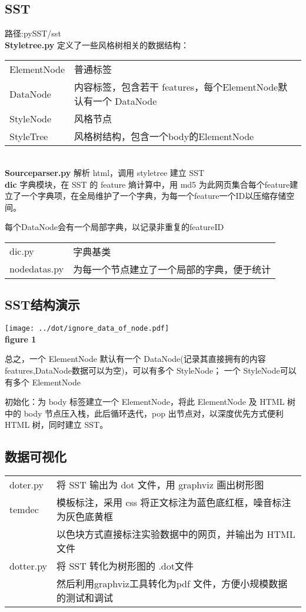 \documentclass[a4paper]{ctexart}
\begin{document}
\subsection[t]{SST}
路径:pySST/sst \\ 
\textbf{Styletree.py}  定义了一些风格树相关的数据结构： \\
\begin{tabular}{ll}
    ElementNode& 普通标签 \\
    DataNode& 内容标签，包含若干 features，每个ElementNode默认有一个 DataNode\\
    StyleNode&  风格节点 \\
    StyleTree& 风格树结构，包含一个body的ElementNode
\end{tabular}\\
\textbf{Sourceparser.py} 解析 html，调用 styletree 建立 SST \\
\textbf{dic} 字典模块，在 SST 的 feature 熵计算中，用 md5 为此网页集合每个feature建立了一个字典项，在全局维护了一个字典，为每一个feature一个ID以压缩存储空间。
\par 每个DataNode会有一个局部字典，以记录非重复的feature\quad ID\\
\begin{tabular}{ll}
    dic.py &字典基类\\
    nodedatas.py &为每一个节点建立了一个局部的字典，便于统计 \\
\end{tabular}
\subsection{SST结构演示}
    \begin{center} 
    \texttt{[image: ../dot/ignore\_data\_of\_node.pdf]}\\
    \textbf{figure 1}
    \end{center}
\par 总之，一个 ElementNode 默认有一个 DataNode(记录其直接拥有的内容features,DataNode数据可以为空)，可以有多个 StyleNode；  一个 StyleNode可以有多个 ElementNode 
\par 初始化：为 body 标签建立一个 ElementNode，将此 ElementNode 及 HTML 树中的 body 节点压入栈，此后循环迭代，pop 出节点对，以深度优先方式便利 HTML 树，同时建立 SST。 

\subsection{数据可视化}
\begin{tabular}[t]{ll}
    doter.py    &   将 SST 输出为 dot 文件，用 graphviz 画出树形图 \\
    temdec      &   模板标注，采用 css 将正文标注为蓝色底红框，噪音标注为灰色底黄框\\
                &以色块方式直接标注实验数据中的网页，并输出为 HTML 文件 \\
    dotter.py      &   将 SST 转化为树形图的 .dot文件\\
                    &然后利用graphviz工具转化为pdf 文件，方便小规模数据的测试和调试 \\
\end{tabular}
\end{document}
